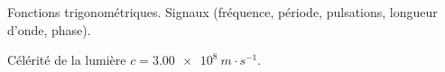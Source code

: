 




\debutFicheEntrainement                                                                      %




\begin{prerequis}
	Fonctions trigonométriques. Signaux (fréquence, période, pulsations, longueur d’onde, phase).
	
	\constantesUtiles
	\begin{listeConstantes}
		\item Célérité de la lumière $c = \SI{3.00e8}{m \cdot s^{-1}}$.
	\end{listeConstantes}
\end{prerequis}












